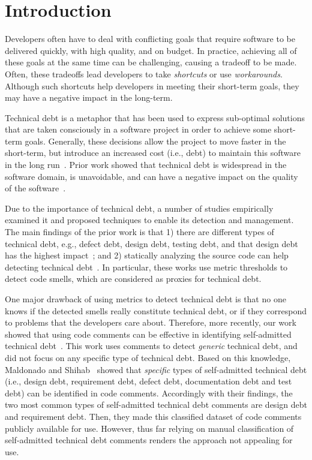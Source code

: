 \documentclass{sig-alternate}
\newcommand{\SATD}{self-admitted technical debt\xspace}
\begin{document}
\section{Introduction}
\label{sec:introduction}
Developers often have to deal with conflicting goals that require software to be delivered quickly, with high quality, and on budget. In practice, achieving all of these goals at the same time can be challenging, causing a tradeoff to be made. Often, these tradeoffs lead developers to take \emph{shortcuts} or use \emph{workarounds}. Although such shortcuts help developers in meeting their short-term goals, they may have a negative impact in the long-term.

Technical debt is a metaphor that has been used to express sub-optimal solutions that are taken consciously in a software project in order to achieve some short-term goals. Generally, these decisions allow the project to move faster in the short-term, but introduce an increased cost (i.e., debt) to maintain this software in the long run~\cite{Seaman2011,Kruchten2013IWMTD}. Prior work showed that technical debt is widespread in the software domain, is unavoidable, and can have a negative impact on the quality of the software~\cite{Lim2012Software}.

Due to the importance of technical debt, a number of studies empirically examined it and proposed techniques to enable its detection and management. The main findings of the prior work is that 1) there are different types of technical debt, e.g., defect debt, design debt, testing debt, and that design debt has the highest impact~\cite{Alves2014MTD,Marinescu2012IBM}; and 2) statically analyzing the source code can help detecting technical debt~\cite{Marinescu2004ICSM,Marinescu2010CSMR,Zazworka2013CSE}. In particular, these works use metric thresholds to detect code smells, which are considered as proxies for technical debt. 

One major drawback of using metrics to detect technical debt is that no one knows if the detected smells really constitute technical debt, or if they correspond to problems that the developers care about. Therefore, more recently, our work showed that using code comments can be effective in identifying self-admitted technical debt~\cite{Potdar2014ICSME}. This work uses comments to detect \emph{generic} technical debt, and did not focus on any specific type of technical debt. Based on this knowledge, Maldonado and Shihab~\cite{Maldonado2015MTD} showed that \emph{specific} types of self-admitted technical debt (i.e., design debt, requirement debt, defect debt, documentation debt and test debt) can be identified in code comments. Accordingly with their findings, the two most common types of \SATD comments are design debt and requirement debt. Then, they made this classified dataset of code comments publicly available for use. However, thus far relying on manual classification of \SATD comments renders the approach not appealing for use.
\end{document}

